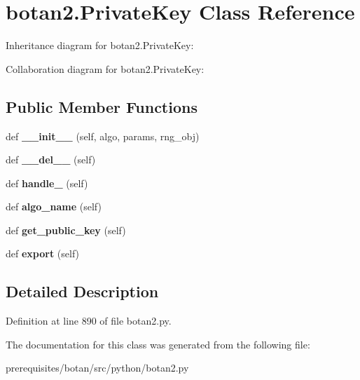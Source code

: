 \hypertarget{classbotan2_1_1_private_key}{}\section{botan2.\+Private\+Key Class Reference}
\label{classbotan2_1_1_private_key}


Inheritance diagram for botan2.\+Private\+Key\+:


Collaboration diagram for botan2.\+Private\+Key\+:
\subsection*{Public Member Functions}
\begin{DoxyCompactItemize}
\item 
\mbox{\label{classbotan2_1_1_private_key_adf97bce0822af244371bad22c9202d1d}} 
def {\bfseries \+\_\+\+\_\+init\+\_\+\+\_\+} (self, algo, params, rng\+\_\+obj)
\item 
\mbox{\label{classbotan2_1_1_private_key_a20a9cf160200d36056e70dec7b0d7a09}} 
def {\bfseries \+\_\+\+\_\+del\+\_\+\+\_\+} (self)
\item 
\mbox{\label{classbotan2_1_1_private_key_a01cfdd801818921f5d056e20eedfd8b7}} 
def {\bfseries handle\+\_\+} (self)
\item 
\mbox{\label{classbotan2_1_1_private_key_ad891e389e822c9a477a71053637e59d8}} 
def {\bfseries algo\+\_\+name} (self)
\item 
\mbox{\label{classbotan2_1_1_private_key_a6b61ee43b03f8e22db9ca121bbc6c597}} 
def {\bfseries get\+\_\+public\+\_\+key} (self)
\item 
\mbox{\label{classbotan2_1_1_private_key_a4b71e6141c8149012bb02bc68f372acc}} 
def {\bfseries export} (self)
\end{DoxyCompactItemize}


\subsection{Detailed Description}


Definition at line 890 of file botan2.\+py.



The documentation for this class was generated from the following file\+:\begin{DoxyCompactItemize}
\item 
prerequisites/botan/src/python/botan2.\+py\end{DoxyCompactItemize}
